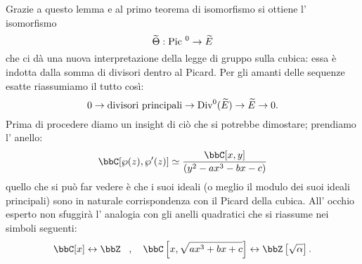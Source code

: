 Grazie a questo lemma e al primo teorema di isomorfismo si ottiene l' isomorfismo
$$
\widetilde{\Theta}: \mbox{Pic }^0 \rightarrow \widetilde{E}
$$
che ci dà una nuova interpretazione della legge di gruppo sulla cubica: essa è indotta dalla somma di divisori dentro al Picard. Per gli amanti delle sequenze esatte riassumiamo il tutto così:
$$
0\rightarrow\mbox{divisori principali}\rightarrow \mbox{Div}^0(\widetilde{E})\rightarrow \widetilde{E}\rightarrow 0.
$$
Prima di procedere diamo un insight di ciò che si potrebbe dimostare; prendiamo l' anello:
$$
\bbC[\wp(z),\wp'(z)]\simeq\frac{\bbC[x,y]}{(y^2 - ax^3 - bx - c)}
$$
quello che si può far vedere è che i suoi ideali (o meglio il modulo dei suoi ideali principali) sono in naturale corrispondenza con il Picard della cubica. All' occhio esperto non sfuggirà l' analogia con gli anelli quadratici che si riassume nei simboli seguenti:
$$
\bbC[x] \leftrightarrow \bbZ\, \ \ , \ \ \ \bbC\left[x,\sqrt{ax^3+bx+c}\right] \leftrightarrow \bbZ\left[\sqrt{\alpha}\right].
$$ 
